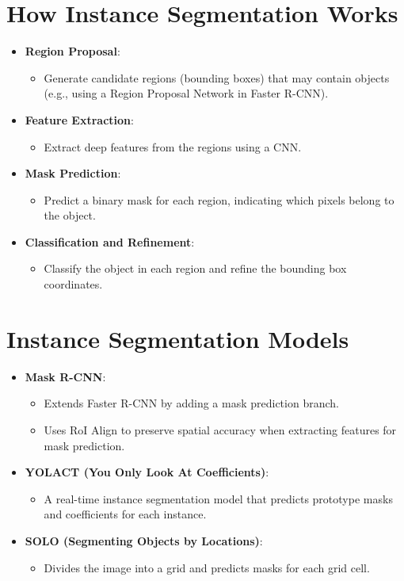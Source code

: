 \begin{notechapter}
\section{How Instance Segmentation Works}
\begin{itemize}
  \item \textbf{Region Proposal}:
    \begin{itemize}
      \item Generate candidate regions (bounding boxes) that may 
        contain objects (e.g., using a Region Proposal Network in 
        Faster R-CNN).
    \end{itemize}
  \item \textbf{Feature Extraction}:
    \begin{itemize}
      \item Extract deep features from the regions using a CNN.
    \end{itemize}
  \item \textbf{Mask Prediction}:
    \begin{itemize}
      \item Predict a binary mask for each region, indicating which 
        pixels belong to the object.
    \end{itemize}
  \item \textbf{Classification and Refinement}:
    \begin{itemize}
      \item Classify the object in each region and refine the bounding 
        box coordinates.
    \end{itemize}
\end{itemize}

\section{Instance Segmentation Models}
\begin{itemize}
  \item \textbf{Mask R-CNN}:
    \begin{itemize}
      \item Extends Faster R-CNN by adding a mask prediction branch.
      \item Uses RoI Align to preserve spatial accuracy when extracting 
        features for mask prediction.
    \end{itemize}
  \item \textbf{YOLACT (You Only Look At Coefficients)}:
    \begin{itemize}
      \item A real-time instance segmentation model that predicts 
        prototype masks and coefficients for each instance.
    \end{itemize}
  \item \textbf{SOLO (Segmenting Objects by Locations)}:
    \begin{itemize}
      \item Divides the image into a grid and predicts masks for each 
        grid cell.
    \end{itemize}
\end{itemize}


\end{notechapter}
